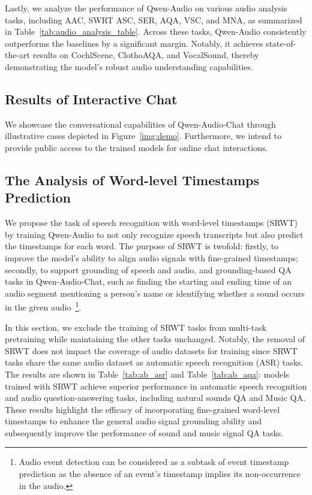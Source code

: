\documentclass{article}
\begin{document}
Lastly, we analyze the performance of Qwen-Audio on various audio analysis tasks, including AAC, SWRT ASC, SER, AQA, VSC, and MNA, as summarized in Table~\ref{tab:audio_analysis_table}. Across these tasks, Qwen-Audio consistently outperforms the baselines by a significant margin. Notably, it achieves state-of-the-art results on CochlScene, ClothoAQA, and VocalSound, thereby demonstrating the model's robust audio understanding capabilities.


\subsection{Results of Interactive Chat}
We showcase the conversational capabilities of Qwen-Audio-Chat through illustrative cases depicted in Figure~\ref{img:demo}. Furthermore, we intend to provide public access to the trained models for online chat interactions.



\subsection{The Analysis of Word-level Timestamps Prediction}
We propose the task of speech recognition with word-level timestamps (SRWT) by training Qwen-Audio to not only recognize speech transcripts but also predict the timestamps for each word. The purpose of SRWT is twofold: firstly, to improve the model's ability to align audio signals with fine-grained timestamps; secondly, to support grounding of speech and audio, and grounding-based QA tasks in Qwen-Audio-Chat, such as finding the starting and ending time of an audio segment mentioning a person's name or identifying whether a sound occurs in the given audio~\footnote{Audio event detection can be considered as a subtask of event timestamp prediction as the absence of an event's timestamp implies its non-occurrence in the audio.}. 

In this section, we exclude the training of SRWT tasks from multi-task pretraining while maintaining the other tasks unchanged. Notably, the removal of SRWT does not impact the coverage of audio datasets for training since SRWT tasks share the same audio dataset as automatic speech recognition (ASR) tasks. The results are shown in Table~\ref{tab:ab_asr} and Table~\ref{tab:ab_aqa}: models trained with SRWT achieve superior performance in automatic speech recognition and audio question-answering tasks, including natural sounds QA and Music QA. These results highlight the efficacy of incorporating fine-grained word-level timestamps to enhance the general audio signal grounding ability and subsequently improve the performance of sound and music signal QA tasks.
\end{document}
